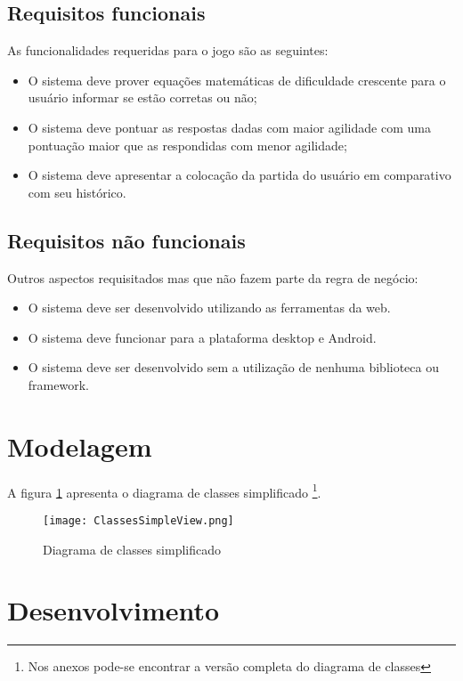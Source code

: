 \subsection{Requisitos funcionais}

\noindent As funcionalidades requeridas para o jogo são as seguintes:

\begin{itemize}
    \item O sistema deve prover equações matemáticas de dificuldade crescente para o usuário informar se estão corretas ou não;
    \item O sistema deve pontuar as respostas dadas com maior agilidade com uma pontuação maior que as respondidas com menor agilidade;
    \item O sistema deve apresentar a colocação da partida do usuário em comparativo com seu histórico.
\end{itemize}

\subsection{Requisitos não funcionais}

\noindent Outros aspectos requisitados mas que não fazem parte da regra de negócio:

\begin{itemize}
    \item O sistema deve ser desenvolvido utilizando as ferramentas da web.
    \item O sistema deve funcionar para a plataforma desktop e Android.
    \item O sistema deve ser desenvolvido sem a utilização de nenhuma biblioteca ou framework.
\end{itemize}

\section{Modelagem}

A figura \ref{fig:simpleDiagram} apresenta o diagrama de classes
simplificado \footnote{Nos anexos pode-se encontrar a versão completa
do diagrama de classes}.

\begin{figure}[H]
    \centering
    \texttt{[image: ClassesSimpleView.png]}
	\caption{Diagrama de classes simplificado}
    \label{fig:simpleDiagram}
\end{figure}

\section{Desenvolvimento}

